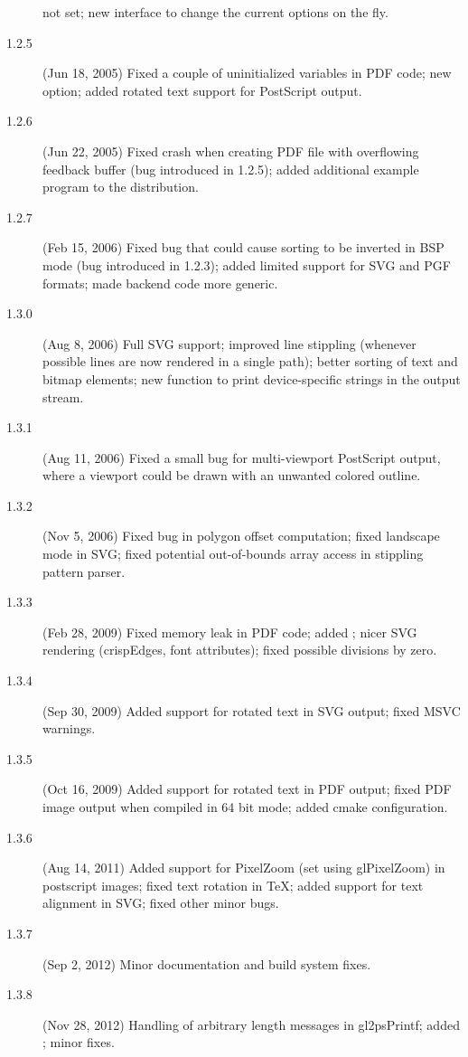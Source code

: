 \begin{description}
  not set; new  interface to change the current
  options on the fly.
\item[1.2.5] (Jun 18, 2005) Fixed a couple of uninitialized variables in
  PDF code; new  option; added rotated
  text support for PostScript output.
\item[1.2.6] (Jun 22, 2005) Fixed crash when creating PDF file with
  overflowing feedback buffer (bug introduced in 1.2.5); added
  additional example program  to the
  distribution.
\item[1.2.7] (Feb 15, 2006) Fixed bug that could cause sorting to be
  inverted in BSP mode (bug introduced in 1.2.3); added limited
  support for SVG and PGF formats; made backend code more generic.
\item[1.3.0] (Aug 8, 2006) Full SVG support; improved line stippling
  (whenever possible lines are now rendered in a single path); better
  sorting of text and bitmap elements; new function 
  to print device-specific strings in the output stream.
\item[1.3.1] (Aug 11, 2006) Fixed a small bug for multi-viewport
  PostScript output, where a viewport could be drawn with an unwanted
  colored outline.
\item[1.3.2] (Nov 5, 2006) Fixed bug in polygon offset computation;
  fixed landscape mode in SVG; fixed potential out-of-bounds array
  access in stippling pattern parser.
\item[1.3.3] (Feb 28, 2009) Fixed memory leak in PDF code; added
  ; nicer SVG rendering (crispEdges, font attributes);
  fixed possible divisions by zero.
\item[1.3.4] (Sep 30, 2009) Added support for rotated text in SVG output;
  fixed MSVC warnings.
\item[1.3.5] (Oct 16, 2009) Added support for rotated text in PDF output;
  fixed PDF image output when compiled in 64 bit mode; added cmake
  configuration.
\item[1.3.6] (Aug 14, 2011) Added support for PixelZoom (set using
  glPixelZoom) in postscript images; fixed text rotation in TeX; added
  support for text alignment in SVG; fixed other minor bugs.
\item[1.3.7] (Sep 2, 2012) Minor documentation and build system fixes.
\item[1.3.8] (Nov 28, 2012) Handling of arbitrary length messages in
  gl2psPrintf; added ; minor fixes.
\end{description}



